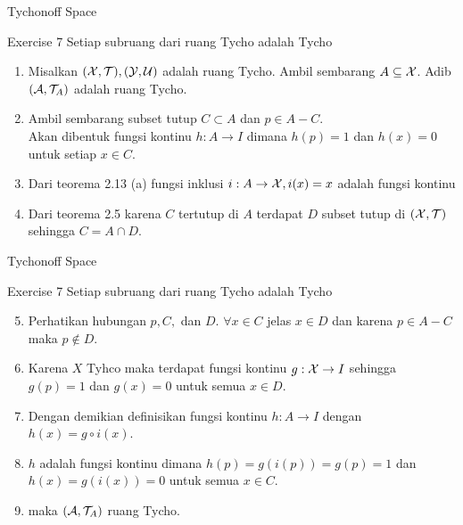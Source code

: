 \begin{frame}{Tychonoff Space}
    \begin{block}{Exercise 7}
        Setiap subruang dari ruang Tycho adalah Tycho
        \begin{enumerate}
            \item Misalkan $(\mathcal{X},\mathcal{T}), (\mathcal{Y},\mathcal{U})$ adalah ruang Tycho. 
            Ambil sembarang $A \subseteq \mathcal{X}$. Adib $(\mathcal{A},\mathcal{T}_A)$ adalah ruang Tycho.
            \item Ambil sembarang subset tutup $C\subset A$ dan $p\in A-C$.\\
            Akan dibentuk fungsi kontinu $h:A \to I$ dimana $h(p)=1$ dan $h(x)=0$ untuk setiap $x\in C$.
            \item Dari teorema 2.13 (a) fungsi inklusi $i:A\to \mathcal{X}, i(x)=x$ adalah fungsi kontinu
            \item Dari teorema 2.5 karena $C$ tertutup di $A$ terdapat $D$ subset tutup di $(\mathcal{X},\mathcal{T})$
            sehingga $C=A\cap D$.
        \end{enumerate}
    \end{block}
\end{frame}

\begin{frame}{Tychonoff Space}
    \begin{block}{Exercise 7}
        Setiap subruang dari ruang Tycho adalah Tycho
        \begin{enumerate}
            \setcounter{enumi}{4}
            \item Perhatikan hubungan $p,C,$ dan $D$. $\forall x\in C$ jelas $x\in D$ 
            dan karena $p \in A-C$ maka $p\notin D$.
            \item Karena $X$ Tyhco maka terdapat fungsi kontinu $g:\mathcal{X} \to I$ sehingga $g(p)=1$ dan $g(x)=0$
            untuk semua $x \in D$.
            \item Dengan demikian definisikan fungsi kontinu $h:A\to I$ dengan $h(x)=g\circ i(x)$.
            \item $h$ adalah fungsi kontinu dimana $h(p) = g(i(p))=g(p)=1$ dan $h(x)=g(i(x))=0$ untuk semua $x\in C$.        
            \item maka $(\mathcal{A},\mathcal{T}_A)$ ruang Tycho.
        \end{enumerate}
    \end{block}
\end{frame}


